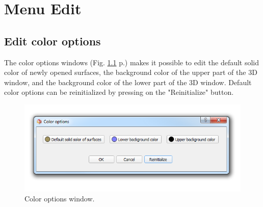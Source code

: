 




\chapter{Menu Edit}
\minitoc  

\section{Edit color options}

\noindent
The color options windows (Fig. \ref{color_options} p.\pageref{color_options}) makes it possible to edit the default solid color of newly opened surfaces, the background color of the upper part of the 3D window, and the background color of the lower part of the 3D window. Default color options can be reinitialized by pressing on the "Reinitialize" button.

\begin{figure}
  \centering
  \includegraphics[scale=0.55]{images/08/color_options.png} 
	\caption{Color options window.}
\label{color_options}
 
\end{figure}



